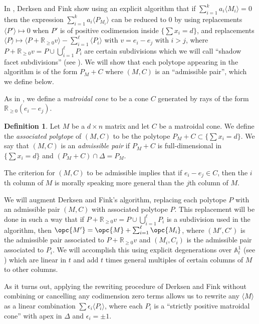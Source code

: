 \documentclass[12pt]{amsart}
\newcommand{\mb}{\mathbb}
\theoremstyle{plain}
\theoremstyle{definition}
\newtheorem{Def}{Definition}[section]
\theoremstyle{remark}
\begin{document}
In \cite[Appendix~A]{Derksen}, Derksen and Fink show using an explicit algorithm that if $\sum_{i=1}^k a_i \langle M_i \rangle=0$ then the expression $\sum_{i=1}^k a_i \langle P_{M_i} \rangle$ can be reduced to $0$ by using replacements $\langle P'\rangle\mapsto 0$ when $P'$ is of positive codimension inside $\{\sum x_i=d\}$, and replacements $\langle P \rangle\mapsto\langle P+\mb{R}_{\ge 0}v \rangle - \sum_{i=1}^\ell \langle P_i \rangle$ with $v=e_i-e_j$ with $i>j$, where $P+\mb{R}_{\ge 0}v = P \cup \bigcup_{i=1}^\ell P_i$  are certain subdivisions which we will call ``shadow facet subdivisions'' (see ). We will show that each polytope appearing in the algorithm is of the form $P_M+C$ where $(M,C)$ is an ``admissible pair'', which we define below.

As in , we define a \emph{matroidal cone} to be a cone $C$ generated by rays of the form $\mb{R}_{\ge 0}(e_i-e_j)$.

\begin{Def}
Let $M$ be a $d \times n$ matrix and let $C$ be a matroidal cone. We define the \emph{associated polytope} of $(M,C)$ to be the polytope $P_M+C \subset \{\sum x_i=d\}$. We say that $(M, C)$ is an \emph{admissible pair} if $P_{M} + C$ is full-dimensional in $\{\sum x_i = d\}$ and $(P_M + C) \cap \Delta = P_M$.
\end{Def}

The criterion for $(M,C)$ to be admissible implies that if $e_i-e_j \in C$, then the $i$th column of $M$ is morally speaking more general than the $j$th column of $M$.

We will augment Derksen and Fink's algorithm, replacing each polytope $P$ with an admissible pair $(M,C)$ with associated polytope $P$. This replacement will be done in such a way that if $P+\mb{R}_{\ge 0}v  =  P  \cup \bigcup_{i=1}^\ell  P_i $ is a subdivision used in the algorithm, then $\opc{M'}=\opc{M}+\sum_{i=1}^\ell \opc{M_i}$, where $(M',C')$ is the admissible pair associated to $P+\mb{R}_{\ge 0}v$ and $(M_i,C_i)$ is the admissible pair associated to $P_i$. We will accomplish this using explicit degenerations over $\mb{A}^1_t$ (see ) which are linear in $t$ and add $t$ times general multiples of certain columns of $M$ to other columns. 

As it turns out, applying the rewriting procedure of Derksen and Fink without combining or cancelling any codimension zero terms allows us to rewrite any $\langle M \rangle$ as a linear combination $\sum \epsilon_i \langle P_i \rangle$, where each $P_i$ is a ``strictly positive matroidal cone'' with apex in $\Delta$ and $\epsilon_i = \pm 1$.
\end{document}
